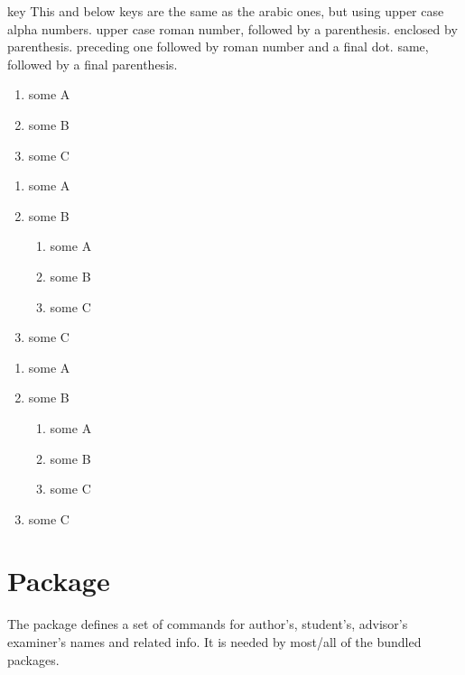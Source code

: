 \documentclass[article,nogeometry,english,tocdepth=3,secdepth=3]{ufrgscca} %
\begin{document}
\begin{describelist}{key}
	 { This and below keys are the same as the arabic ones, but using upper case alpha numbers.}
	 { upper case roman number, followed by a parenthesis.}
	 { enclosed by parenthesis.}
	 { preceding one followed by roman number and a final dot.}
	 { same, followed by a final parenthesis.}
	\begin{codestore}[st=enumC]
	\begin{enumerate}
		\item some A
		\item some B
		\item some C
	\end{enumerate}
	\begin{enumerate}
		\item some A
		\item some B
		\begin{enumerate}
			\item some A
			\item some B
			\item some C
		\end{enumerate}
		\item some C
	\end{enumerate}
	\begin{enumerate}
		\item some A
		\item some B
		\begin{enumerate}
			\item some A
			\item some B
			\item some C
		\end{enumerate}
		\item some C
	\end{enumerate}
\end{codestore}



\end{describelist}




\section{ Package}
The  package defines a set of commands for author's, student's, advisor's examiner's names and related info. It is needed by most/all of the bundled packages.
\end{document}
